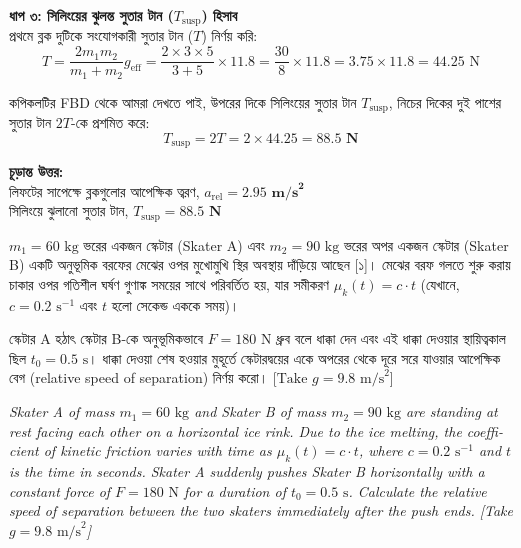 \documentclass[12pt, a4paper]{article}
\begin{document}
\begin{tcolorbox}[solutionbox={সমাধান (Solution)}]
\vspace{0.5em}
\noindent
\textbf{ধাপ ৩: সিলিংয়ের ঝুলন্ত সুতার টান ($T_{\text{susp}}$) হিসাব} \\
প্রথমে ব্লক দুটিকে সংযোগকারী সুতার টান ($T$) নির্ণয় করি:
$$T = \frac{2 m_1 m_2}{m_1 + m_2} g_{\text{eff}} = \frac{2 \times 3 \times 5}{3 + 5} \times 11.8 = \frac{30}{8} \times 11.8 = 3.75 \times 11.8 = 44.25\text{ N}$$

কপিকলটির FBD থেকে আমরা দেখতে পাই, উপরের দিকে সিলিংয়ের সুতার টান $T_{\text{susp}}$, নিচের দিকের দুই পাশের সুতার টান $2T$-কে প্রশমিত করে:
$$T_{\text{susp}} = 2T = 2 \times 44.25 = \mathbf{88.5\text{ N}}$$

\vspace{1em}
\begin{tcolorbox}[answerbox]
\textbf{চূড়ান্ত উত্তর:} \\
লিফটের সাপেক্ষে ব্লকগুলোর আপেক্ষিক ত্বরণ, $a_{\text{rel}} = \mathbf{2.95\text{ m/s}^2}$ \\
সিলিংয়ে ঝুলানো সুতার টান, $T_{\text{susp}} = \mathbf{88.5\text{ N}}$
\end{tcolorbox}
\end{tcolorbox}

\begin{tcolorbox}[questionbox={প্রশ্ন (Question) 14}]
\noindent
$m_1 = 60\text{ kg}$ ভরের একজন স্কেটার (Skater A) এবং $m_2 = 90\text{ kg}$ ভরের অপর একজন স্কেটার (Skater B) একটি অনুভূমিক বরফের মেঝের ওপর মুখোমুখি স্থির অবস্থায় দাঁড়িয়ে আছেন [১]। মেঝের বরফ গলতে শুরু করায় চাকার ওপর গতিশীল ঘর্ষণ গুণাঙ্ক সময়ের সাথে পরিবর্তিত হয়, যার সমীকরণ $\mu_k(t) = c \cdot t$ (যেখানে, $c = 0.2\text{ s}^{-1}$ এবং $t$ হলো সেকেন্ড এককে সময়)। 

\vspace{0.3em}
\noindent
স্কেটার A হঠাৎ স্কেটার B-কে অনুভূমিকভাবে $F = 180\text{ N}$ ধ্রুব বলে ধাক্কা দেন এবং এই ধাক্কা দেওয়ার স্থায়িত্বকাল ছিল $t_0 = 0.5\text{ s}$। ধাক্কা দেওয়া শেষ হওয়ার মুহূর্তে স্কেটারদ্বয়ের একে অপরের থেকে দূরে সরে যাওয়ার আপেক্ষিক বেগ (relative speed of separation) নির্ণয় করো। [$\text{Take } g = 9.8\text{ m/s}^2$]

\vspace{0.8em}
\begin{english}
\noindent\textit{\color{darkgray}
Skater A of mass $m_1 = 60\text{ kg}$ and Skater B of mass $m_2 = 90\text{ kg}$ are standing at rest facing each other on a horizontal ice rink. Due to the ice melting, the coefficient of kinetic friction varies with time as $\mu_k(t) = c \cdot t$, where $c = 0.2\text{ s}^{-1}$ and $t$ is the time in seconds. Skater A suddenly pushes Skater B horizontally with a constant force of $F = 180\text{ N}$ for a duration of $t_0 = 0.5\text{ s}$. Calculate the relative speed of separation between the two skaters immediately after the push ends. [Take $g = 9.8\text{ m/s}^2$]
}
\end{english}
\end{tcolorbox}
\end{document}
